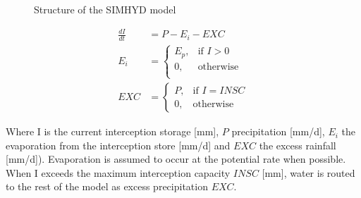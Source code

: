 { 																	%
\begin{figure}
\caption{Structure of the SIMHYD model} \label{fig:18_schematic}
\end{figure}

\begin{align}
	\frac{dI}{dt} &= P-E_i-EXC \\
	E_i &= \begin{cases}
		E_p, &\text{if } I > 0 \\
		0, & \text{otherwise} \\
	\end{cases} \\
	EXC &= 
	\begin{cases}
		P, & \text{if } I = INSC \\
		0, & \text{otherwise}
	\end{cases}
\end{align}

Where I is the current interception storage [mm], $P$ precipitation [mm/d], $E_i$ the evaporation from the interception store [mm/d] and $EXC$ the excess rainfall [mm/d]). Evaporation is assumed to occur at the potential rate when possible. When I exceeds the maximum interception capacity $INSC$ [mm], water is routed to the rest of the model as excess precipitation $EXC$. 

} %
\vspace{1cm}
